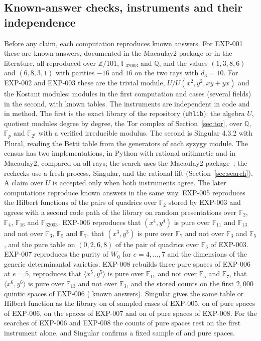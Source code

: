 \documentclass[11pt]{article}
\theoremstyle{definition}
\theoremstyle{remark}
\newcommand{\EXP}[1]{\mbox{EXP-#1}}
\newcommand{\Q}{\mathbb{Q}}
\newcommand{\F}{\mathbb{F}}
\begin{document}
\subsection{Known-answer checks, instruments and their independence}

Before any claim, each computation reproduces known answers. For \EXP{001} these are \ngateThreeEach{} known answers, documented in the Macaulay2 package or in the literature, all reproduced over $\mathbb{Z}/101$, $\F_{32003}$ and $\Q$, and the values $(1,3,8,6)$ and $(6,8,3,1)$ with parities $-16$ and $16$ on the two rays with $d_3=10$. For \EXP{002} and \EXP{003} these are the trivial module, $U/U(x^2,y^2,xy+yx)$ and the Kostant modules: \ncalibModules{} modules in the first computation and \nthreeCalib{} cases (several fields) in the second, with known tables. The instruments are independent in code and in method. The first is the exact library of the repository (\texttt{uhlib}): the algebra $U$, quotient modules degree by degree, the Tor complex of Section~\ref{sec:tor}, over $\Q$, $\F_p$ and $\F_{2^r}$ with a verified irreducible modulus. The second is Singular 4.3.2 with Plural, reading the Betti table from the generators of each syzygy module. The census has two implementations, in Python with rational arithmetic and in Macaulay2, compared on all \nrays{} rays; the search uses the Macaulay2 package~\cite{M2BS}; the rechecks use a fresh process, Singular, and the rational lift (Section~\ref{sec:search}). A claim over $U$ is accepted only when both instruments agree. The later computations reproduce known answers in the same way. \EXP{005} reproduces the Hilbert functions of the \nfiveGOneCompared{} pairs of quadrics over $\F_2$ stored by \EXP{003} and agrees with a second code path of the library on \nfiveGTwoCompared{} random presentations over $\F_2$, $\F_4$, $\F_{16}$ and $\F_{32003}$. \EXP{006} reproduces that $(x^4,y^4)$ is pure over $\F_{11}$ and $\F_{13}$ and not over $\F_3$, $\F_5$ and $\F_7$, that $(x^3,y^3)$ is pure over $\F_7$ and not over $\F_3$ and $\F_5$, and the pure table on $(0,2,6,8)$ of the pair of quadrics over $\F_3$ of \EXP{003}. \EXP{007} reproduces the purity of $W_0$ for $e=4,\dots,7$ and the dimensions of the generic determinantal varieties. \EXP{008} rebuilds three pure spaces of \EXP{006} at $e=5$, reproduces that $\langle x^5,y^5\rangle$ is pure over $\F_{11}$ and not over $\F_5$ and $\F_7$, that $\langle x^6,y^6\rangle$ is pure over $\F_{13}$ and not over $\F_3$, and the stored counts on the first $2{,}000$ quintic spaces of \EXP{006} (\neightGOneCases{} known answers). Singular gives the same table or Hilbert function as the library on \nfiveGThreeAgree{} of \nfiveGThreeCompared{} sampled cases of \EXP{005}, on \nsixSingularSample{} of \nsixSingularSample{} pure spaces of \EXP{006}, on the \nsevenGThreeSpaces{} spaces of \EXP{007} and on \neightSingularSample{} of \neightSingularSample{} pure spaces of \EXP{008}. For the searches of \EXP{006} and \EXP{008} the counts of pure spaces rest on the first instrument alone, and Singular confirms a fixed sample of \nsixSingularSample{} and \neightSingularSample{} pure spaces.
\end{document}
